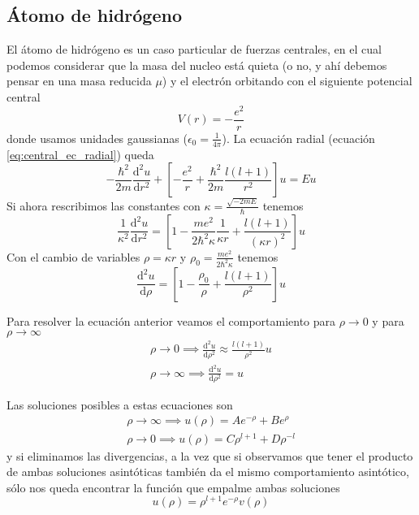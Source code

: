 \subsection{Átomo de hidrógeno}
El átomo de hidrógeno es un caso particular de fuerzas centrales, en el cual podemos considerar que la masa del nucleo está quieta (o no, y ahí debemos pensar en una masa reducida $\mu$) y el electrón orbitando con el siguiente potencial central
\begin{equation}
    V(r) = -\frac{e^2}{r}
\end{equation}
donde usamos unidades gaussianas ($\epsilon_0 = \frac{1}{4\pi}$).
La ecuación radial (ecuación \ref{eq:central_ec_radial}) queda
\begin{equation}
    -\frac{\hbar^2}{2m} \frac{\mathrm{d}^2 u}{\mathrm{d}r^2} + \left[ - \frac{e^2}{r} + \frac{\hbar^2}{2m} \frac{l (l + 1)}{r^2} \right] u = E u
\end{equation}
Si ahora rescribimos las constantes con $\kappa = \frac{\sqrt{-2mE}}{\hbar}$ tenemos
\[\frac{1}{\kappa^2} \frac{\mathrm{d}^2 u}{\mathrm{d} r^2} = \left[1 - \frac{m e^2}{2 \hbar^2 \kappa} \frac{1}{\kappa r} + \frac{l (l + 1)}{(\kappa r)^2} \right] u\]
Con el cambio de variables $\rho = \kappa r$ y $\rho_0 = \frac{m e^2}{2 \hbar^2 \kappa}$ tenemos
\begin{equation}
    \frac{\mathrm{d}^2 u}{\mathrm{d}\rho} = \left[1 - \frac{\rho_0}{\rho} + \frac{l(l + 1)}{\rho^2}\right] u
\end{equation}

Para resolver la ecuación anterior veamos el comportamiento para $\rho \to 0$ y para $\rho \to \infty$
\begin{equation}
    \begin{gathered}
        \rho \to 0 \implies \frac{\mathrm{d}^2 u}{\mathrm{d} \rho^2} \approx \frac{l(l + 1)}{\rho^2} u\\
        \rho \to \infty \implies \frac{\mathrm{d}^2 u}{\mathrm{d} \rho^2} = u
    \end{gathered}
\end{equation}

Las soluciones posibles a estas ecuaciones son
\begin{equation}
    \begin{gathered}
        \rho \to \infty  \implies u(\rho) = A e^{-\rho} + B e^{\rho} \\
        \rho \to 0 \implies u(\rho) = C \rho^{l + 1} + D \rho^{-l}
    \end{gathered}
\end{equation}
y si eliminamos las divergencias, a la vez que si observamos que tener el producto de ambas soluciones asintóticas también da el mismo comportamiento asintótico, sólo nos queda encontrar la función que empalme ambas soluciones
\begin{equation}
    u(\rho) = \rho^{l + 1} e^{-\rho} v(\rho)
\end{equation}

